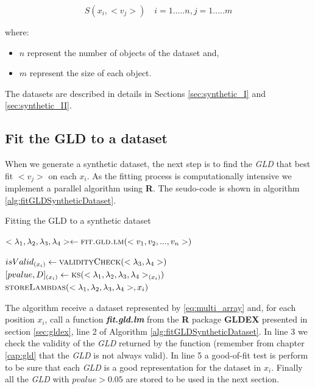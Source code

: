 \begin{equation}\label{eq:multi_array}
S(x_{i}, <v_{j}>) \quad i=1.....n,j=1.....m
\end{equation}

where:
\begin{itemize}
\item $n$ represent the number of objects of the dataset and,
\item $m$ represent the size of each object.
\end{itemize}

The datasets are described in details in Sections \ref{sec:synthetic_I} and \ref{sec:synthetic_II}. 


\subsection{Fit the GLD to a dataset}\label{sub:fitting_gld}
When we generate a synthetic dataset, the next step is to find the \textit{GLD} that best fit $<v_{j}>$ on each $x_{i}$. As the fitting process is computationally intensive we implement a parallel algorithm using \textbf{R}. The seudo-code is shown in algorithm \ref{alg:fitGLDSyntheticDataset}.

\begin{algorithm} 
\caption{Fitting the GLD to a synthetic dataset}\label{alg:fitGLDSyntheticDataset}
\begin{algorithmic}[1] 
\State $<\lambda_{1},\lambda_{2},\lambda_{3},\lambda_{4}> \gets \Call {fit.gld.lm}{<v_1,v_2,...,v_{n}>}$

\State $isValid_{(x_{i})} \gets \Call {validityCheck}{<\lambda_{3},\lambda_{4}>}$
\State $[pvalue,D]_{(x_{i})} \gets \Call{ks}{<\lambda_{1},\lambda_{2},\lambda_{3},\lambda_{4}>_{(x_{i})}}$
\EndIf
{}
\State $\Call{storeLambdas}{<\lambda_{1},\lambda_{2},\lambda_{3},\lambda_{4}>,x_{i}}$
\EndIf
\EndFunction 
\end{algorithmic} 
\end{algorithm} 

The algorithm receive a dataset represented by \ref{eq:multi_array} and, for each position $x_{i}$, call a function \textbf{\textit{fit.gld.lm}} from the \textbf{R} package \textbf{GLDEX} presented in section \ref{sec:gldex}, line 2 of Algorithm \ref{alg:fitGLDSyntheticDataset}. In line 3 we check the validity of the \textit{GLD} returned by the function (remember from chapter \ref{cap:gld} that the \textit{GLD} is not always valid). In line 5 a good-of-fit test is perform to be sure that each \textit{GLD} is a good representation for the dataset in $x_{i}$. Finally all the \textit{GLD} with $pvalue > 0.05$ are stored to be used in the next section.

